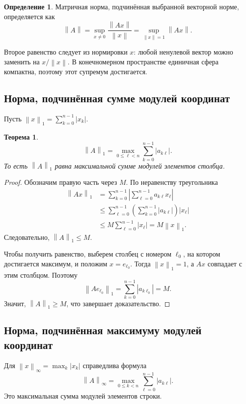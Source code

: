\documentclass[12pt,a4paper]{article}
\newtheorem{theorem}{Теорема}
\theoremstyle{definition}
\newtheorem{definition}{Определение}
\theoremstyle{remark}
\newcommand{\norm}[1]{\left\lVert #1\right\rVert}
\begin{document}
\begin{definition}
Матричная норма, подчинённая выбранной векторной норме, определяется как
\[
  \norm{A}=\sup_{x\ne0}\frac{\norm{Ax}}{\norm{x}}
  =\sup_{\norm{x}=1}\norm{Ax}.
\]
\end{definition}

Второе равенство следует из нормировки $x$: любой ненулевой вектор можно
заменить на $x/\norm{x}$. В конечномерном пространстве единичная сфера
компактна, поэтому этот супремум достигается.

\subsection{Норма, подчинённая сумме модулей координат}

Пусть $\norm{x}_1=\sum_{k=0}^{n-1}|x_k|$.

\begin{theorem}
\[
  \boxed{\norm{A}_1=\max_{0\leqslant\ell<n}
    \sum_{k=0}^{n-1}|a_{k\ell}|}.
\]
То есть $\norm{A}_1$ равна максимальной сумме модулей элементов столбца.
\end{theorem}

\begin{proof}
Обозначим правую часть через $M$. По неравенству треугольника
\begin{align*}
  \norm{Ax}_1
  &=\sum_{k=0}^{n-1}\left|\sum_{\ell=0}^{n-1}a_{k\ell}x_\ell\right|\\
  &\leqslant\sum_{\ell=0}^{n-1}
    \left(\sum_{k=0}^{n-1}|a_{k\ell}|\right)|x_\ell|\\
  &\leqslant M\sum_{\ell=0}^{n-1}|x_\ell|=M\norm{x}_1.
\end{align*}
Следовательно, $\norm{A}_1\leqslant M$.

Чтобы получить равенство, выберем столбец с номером $\ell_0$, на котором
достигается максимум, и положим $x=e_{\ell_0}$. Тогда $\norm{x}_1=1$,
а $Ax$ совпадает с этим столбцом. Поэтому
\[
  \norm{Ae_{\ell_0}}_1=\sum_{k=0}^{n-1}|a_{k\ell_0}|=M.
\]
Значит, $\norm{A}_1\geqslant M$, что завершает доказательство.
\end{proof}

\subsection{Норма, подчинённая максимуму модулей координат}

Для $\norm{x}_\infty=\max_k|x_k|$ справедлива формула
\[
  \boxed{\norm{A}_\infty=\max_{0\leqslant k<n}
    \sum_{\ell=0}^{n-1}|a_{k\ell}|}.
\]
Это максимальная сумма модулей элементов строки.
\end{document}
